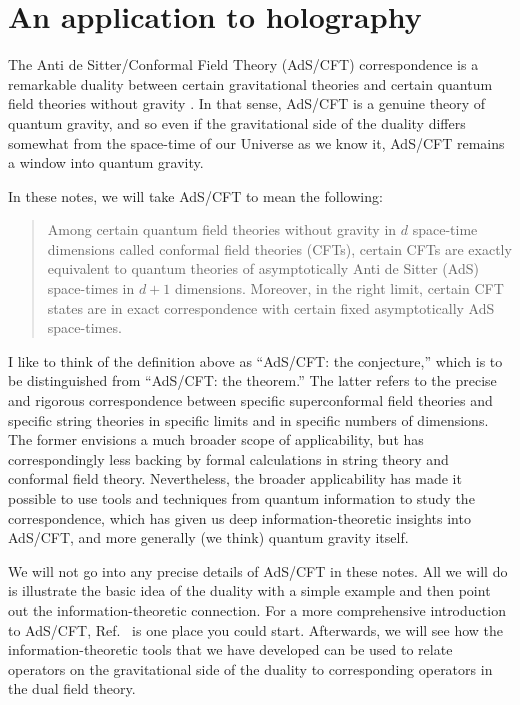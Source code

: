 \documentclass[a4paper,11pt]{article}
\renewcommand{\Ref}[1]{Ref.~\cite{#1}}
\begin{document}
\section{An application to holography}
\label{sec:holo}

The Anti de Sitter/Conformal Field Theory (AdS/CFT) correspondence is a remarkable duality between certain gravitational theories and certain quantum field theories without gravity \cite{Maldacena:1997re,Witten:1998qj}.
In that sense, AdS/CFT is a genuine theory of quantum gravity, and so even if the gravitational side of the duality differs somewhat from the space-time of our Universe as we know it, AdS/CFT remains a window into quantum gravity.

In these notes, we will take AdS/CFT to mean the following:
\begin{quote}
Among certain quantum field theories without gravity in $d$ space-time dimensions called conformal field theories (CFTs), certain CFTs are exactly equivalent to quantum theories of asymptotically Anti de Sitter (AdS) space-times in $d+1$ dimensions.
Moreover, in the right limit, certain CFT states are in exact correspondence with certain fixed asymptotically AdS space-times.
\end{quote}
I like to think of the definition above as ``AdS/CFT: the conjecture,'' which is to be distinguished from ``AdS/CFT: the theorem.''
The latter refers to the precise and rigorous correspondence between specific superconformal field theories and specific string theories in specific limits and in specific numbers of dimensions.
The former envisions a much broader scope of applicability, but has correspondingly less backing by formal calculations in string theory and conformal field theory.
Nevertheless, the broader applicability has made it possible to use tools and techniques from quantum information to study the correspondence, which has given us deep information-theoretic insights into AdS/CFT, and more generally (we think) quantum gravity itself.

We will not go into any precise details of AdS/CFT in these notes.
All we will do is illustrate the basic idea of the duality with a simple example and then point out the information-theoretic connection.
For a more comprehensive introduction to AdS/CFT, \Ref{Nastase:2007kj} is one place you could start.
Afterwards, we will see how the information-theoretic tools that we have developed can be used to relate operators on the gravitational side of the duality to corresponding operators in the dual field theory.
\end{document}
